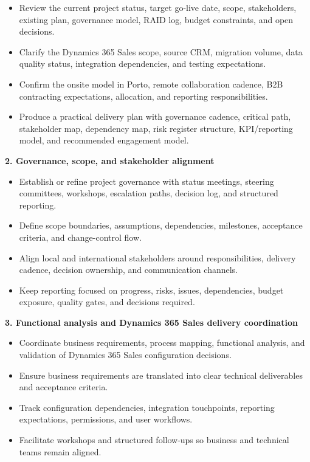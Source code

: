 \documentclass[11pt,a4paper]{article}
\begin{document}
\begin{itemize}
\item Review the current project status, target go-live date, scope, stakeholders, existing plan, governance model, RAID log, budget constraints, and open decisions.
\item Clarify the Dynamics 365 Sales scope, source CRM, migration volume, data quality status, integration dependencies, and testing expectations.
\item Confirm the onsite model in Porto, remote collaboration cadence, B2B contracting expectations, allocation, and reporting responsibilities.
\item Produce a practical delivery plan with governance cadence, critical path, stakeholder map, dependency map, risk register structure, KPI/reporting model, and recommended engagement model.
\end{itemize}

\textbf{2. Governance, scope, and stakeholder alignment}\par

\begin{itemize}
\item Establish or refine project governance with status meetings, steering committees, workshops, escalation paths, decision log, and structured reporting.
\item Define scope boundaries, assumptions, dependencies, milestones, acceptance criteria, and change-control flow.
\item Align local and international stakeholders around responsibilities, delivery cadence, decision ownership, and communication channels.
\item Keep reporting focused on progress, risks, issues, dependencies, budget exposure, quality gates, and decisions required.
\end{itemize}

\textbf{3. Functional analysis and Dynamics 365 Sales delivery coordination}\par

\begin{itemize}
\item Coordinate business requirements, process mapping, functional analysis, and validation of Dynamics 365 Sales configuration decisions.
\item Ensure business requirements are translated into clear technical deliverables and acceptance criteria.
\item Track configuration dependencies, integration touchpoints, reporting expectations, permissions, and user workflows.
\item Facilitate workshops and structured follow-ups so business and technical teams remain aligned.
\end{itemize}
\end{document}
